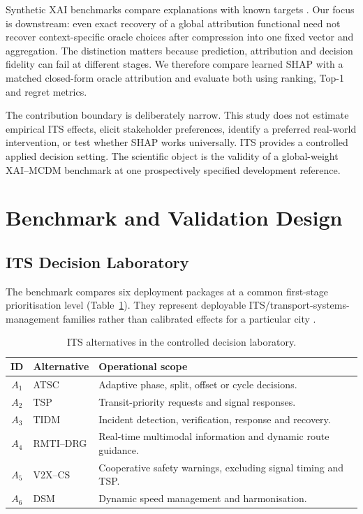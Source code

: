 \documentclass[runningheads]{llncs}
\begin{document}
Synthetic XAI benchmarks compare explanations with known targets
\cite{liu2021xaibench,agarwal2022openxai}. Our focus is downstream: even exact recovery of a
global attribution functional need not recover context-specific oracle choices after
compression into one fixed vector and aggregation. The distinction matters because prediction,
attribution and decision fidelity can fail at different stages. We therefore compare learned
SHAP with a matched closed-form oracle attribution and evaluate both using ranking, Top-1 and
regret metrics.

The contribution boundary is deliberately narrow. This study does not estimate empirical ITS
effects, elicit stakeholder preferences, identify a preferred real-world intervention, or test
whether SHAP works universally. ITS provides a controlled applied decision setting. The
scientific object is the validity of a global-weight XAI--MCDM benchmark at one prospectively
specified development reference.

\section{Benchmark and Validation Design}
\label{sec:methods}

\subsection{ITS Decision Laboratory}

The benchmark compares six deployment packages at a common first-stage prioritisation level
(Table~\ref{tab:alternatives}). They represent deployable ITS/transport-systems-management
families rather than calibrated effects for a particular city
\cite{fhwa2016corridors,fhwa2017atm,usdotv2x}.

\begin{table}[t]
\centering
\caption{ITS alternatives in the controlled decision laboratory.}
\label{tab:alternatives}
\small
\begin{tabularx}{\linewidth}{@{}c l X@{}}
\toprule
\textbf{ID} & \textbf{Alternative} & \textbf{Operational scope}\\
\midrule
$A_1$ & ATSC & Adaptive phase, split, offset or cycle decisions.\\
$A_2$ & TSP & Transit-priority requests and signal responses.\\
$A_3$ & TIDM & Incident detection, verification, response and recovery.\\
$A_4$ & RMTI--DRG & Real-time multimodal information and dynamic route guidance.\\
$A_5$ & V2X--CS & Cooperative safety warnings, excluding signal timing and TSP.\\
$A_6$ & DSM & Dynamic speed management and harmonisation.\\
\bottomrule
\end{tabularx}
\end{table}
\end{document}
